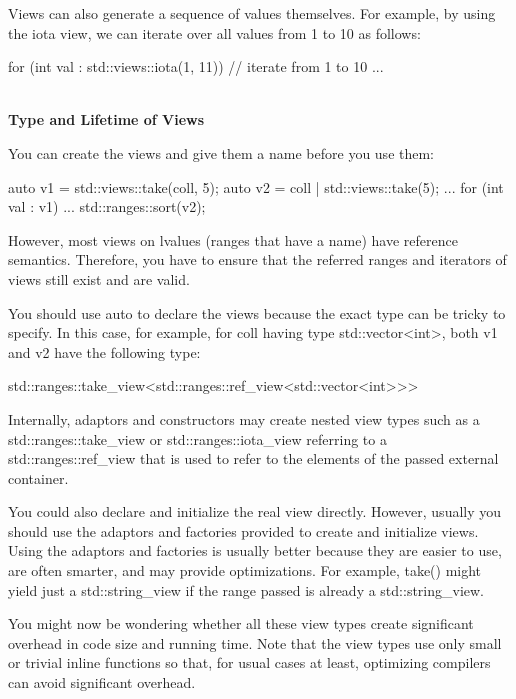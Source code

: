 Views can also generate a sequence of values themselves. For example, by using the iota view, we can iterate over all values from 1 to 10 as follows:

\begin{cpp}
for (int val : std::views::iota(1, 11)) { // iterate from 1 to 10
	...
}
\end{cpp}

\noindent
\hspace*{\fill} \\ %
\textbf{Type and Lifetime of Views}

You can create the views and give them a name before you use them:

\begin{cpp}
auto v1 = std::views::take(coll, 5);
auto v2 = coll | std::views::take(5);
...
for (int val : v1) {
	...
}
std::ranges::sort(v2);
\end{cpp}

However, most views on lvalues (ranges that have a name) have reference semantics. Therefore, you have to ensure that the referred ranges and iterators of views still exist and are valid.

You should use auto to declare the views because the exact type can be tricky to specify. In this case, for example, for coll having type std::vector<int>, both v1 and v2 have the following type:

\begin{cpp}
std::ranges::take_view<std::ranges::ref_view<std::vector<int>>>
\end{cpp}

Internally, adaptors and constructors may create nested view types such as a std::ranges::take\_view or std::ranges::iota\_view referring to a std::ranges::ref\_view that is used to refer to the elements of the passed external container.

You could also declare and initialize the real view directly. However, usually you should use the adaptors and factories provided to create and initialize views. Using the adaptors and factories is usually better because they are easier to use, are often smarter, and may provide optimizations. For example, take() might yield just a std::string\_view if the range passed is already a std::string\_view.

You might now be wondering whether all these view types create significant overhead in code size and running time. Note that the view types use only small or trivial inline functions so that, for usual cases at least, optimizing compilers can avoid significant overhead.

